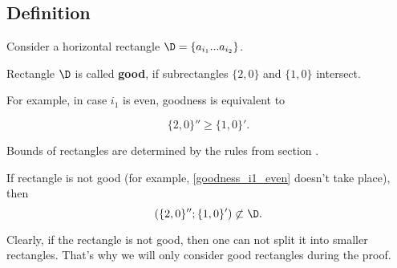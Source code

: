 \subsection{Definition}

Consider a horizontal rectangle $\D = \left\{ a_{i_1} ... a_{i_2} \right\}$.

\begin{definition}
	Rectangle $\D$ is called \textbf{good},
	if subrectangles
	$\{2, 0\}$ and $\{1, 0\}$ intersect.
\end{definition}


For example, in case $i_1$ is even, goodness is equivalent to

\begin{equation}\label{goodness_i1_even}
	\{2, 0\}'' \geqslant \{1, 0\}'.
\end{equation}

Bounds of rectangles are determined by the rules from section .

If rectangle is not good (for example, \ref{goodness_i1_even} doesn't take place), then
$$ ( \{2, 0\}'' ; \{1, 0\}' ) \not\subset \D. $$

Clearly, if the rectangle is not good, then one can not split it into smaller rectangles.
That's why we will only consider good rectangles during the proof.

